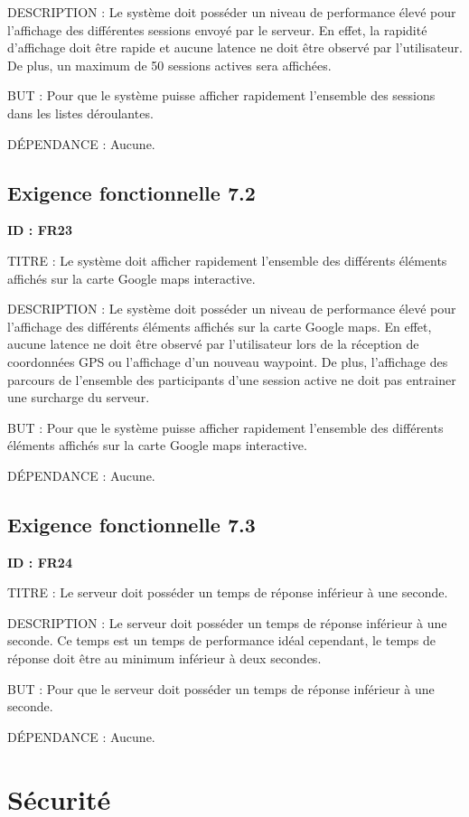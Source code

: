\documentclass[titlepage, 12pt]{report}
\begin{document}
DESCRIPTION : Le système doit posséder un niveau de performance élevé pour l'affichage des différentes sessions envoyé par le serveur. En effet, la rapidité d'affichage doit être rapide et aucune latence ne doit être observé par l'utilisateur. De plus, un maximum de 50 sessions actives sera affichées. 

BUT : Pour que le système puisse afficher rapidement l'ensemble des sessions dans les listes déroulantes.

DÉPENDANCE : Aucune.

\subsection{Exigence fonctionnelle 7.2}

\textbf{ID : FR23}

TITRE : Le système doit afficher rapidement l'ensemble des différents éléments affichés sur la carte Google maps interactive.

DESCRIPTION : Le système doit posséder un niveau de performance élevé pour l'affichage des différents éléments affichés sur la carte Google maps. En effet, aucune latence ne doit être observé par l'utilisateur lors de la réception de coordonnées GPS ou l'affichage d'un nouveau waypoint. De plus, l'affichage des parcours de l'ensemble des participants d'une session active ne doit pas entrainer une surcharge du serveur. 

BUT : Pour que le système puisse afficher rapidement l'ensemble des différents éléments affichés sur la carte Google maps interactive.

DÉPENDANCE : Aucune.

\subsection{Exigence fonctionnelle 7.3}

\textbf{ID : FR24}

TITRE : Le serveur doit posséder un temps de réponse inférieur à une seconde.

DESCRIPTION : Le serveur doit posséder un temps de réponse inférieur à une seconde. Ce temps est un temps de performance idéal cependant, le temps de réponse doit être au minimum inférieur à deux secondes.  

BUT : Pour que le serveur doit posséder un temps de réponse inférieur à une seconde.

DÉPENDANCE : Aucune.

\section{Sécurité}
\end{document}
